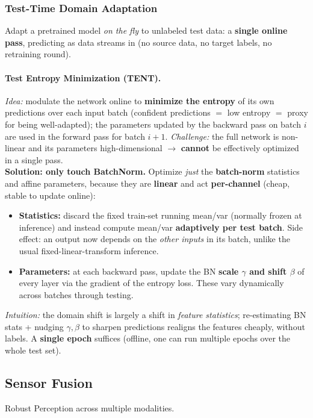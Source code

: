 \documentclass{article}
\begin{document}
\subsubsection{Test-Time Domain Adaptation}
Adapt a pretrained model \textit{on the fly} to unlabeled test data: a \textbf{single online pass}, predicting as data streams in (no source data, no target labels, no retraining round).

\paragraph{Test Entropy Minimization (TENT).}
\textit{Idea:} modulate the network online to \textbf{minimize the entropy} of its own predictions over each input batch (confident predictions $=$ low entropy $=$ proxy for being well-adapted); the parameters updated by the backward pass on batch $i$ are used in the forward pass for batch $i\!+\!1$. \textit{Challenge:} the full network is non-linear and its parameters high-dimensional $\rightarrow$ \textbf{cannot} be effectively optimized in a single pass.\\

\textbf{Solution: only touch BatchNorm.} Optimize \textit{just} the \textbf{batch-norm} statistics and affine parameters, because they are \textbf{linear} and act \textbf{per-channel} (cheap, stable to update online):
\begin{itemize}
    \item \textbf{Statistics:} discard the fixed train-set running mean/var (normally frozen at inference) and instead compute mean/var \textbf{adaptively per test batch}. Side effect: an output now depends on the \textit{other inputs} in its batch, unlike the usual fixed-linear-transform inference.
    \item \textbf{Parameters:} at each backward pass, update the BN \textbf{scale $\gamma$ and shift $\beta$} of every layer via the gradient of the entropy loss. These vary dynamically across batches through testing.
\end{itemize}
\textit{Intuition:} the domain shift is largely a shift in \textit{feature statistics}; re-estimating BN stats + nudging $\gamma,\beta$ to sharpen predictions realigns the features cheaply, without labels. A \textbf{single epoch} suffices (offline, one can run multiple epochs over the whole test set).


\subsection{Sensor Fusion}
Robust Perception across multiple modalities.
\end{document}

